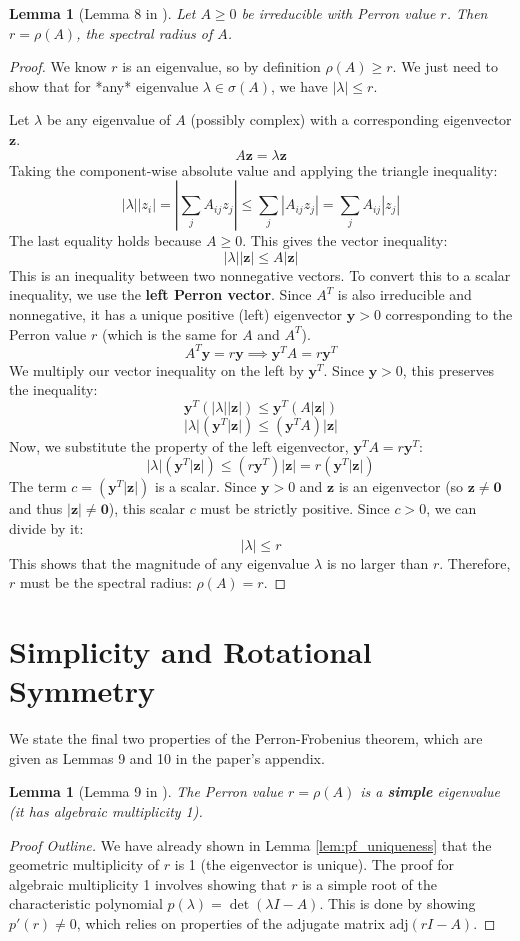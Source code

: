 \documentclass[12pt,a4paper]{report}
\theoremstyle{plain}
\newtheorem{lemma}[theorem]{Lemma}
\theoremstyle{definition}
\theoremstyle{remark}
\begin{document}
\begin{lemma}[Lemma 8 in \cite{main_paper}]\label{lem:pf_dominance}
Let $A \ge 0$ be irreducible with Perron value $r$. Then $r = \rho(A)$, the spectral radius of $A$.
\end{lemma}
\begin{proof}
We know $r$ is an eigenvalue, so by definition $\rho(A) \ge r$. We just need to show that for *any* eigenvalue $\lambda \in \sigma(A)$, we have $|\lambda| \le r$.

Let $\lambda$ be any eigenvalue of $A$ (possibly complex) with a corresponding eigenvector $\bm{z}$.
$$ A\bm{z} = \lambda \bm{z} $$
Taking the component-wise absolute value and applying the triangle inequality:
$$ |\lambda| |z_i| = \left|\sum_j A_{ij} z_j\right| \le \sum_j |A_{ij} z_j| = \sum_j A_{ij} |z_j| $$
The last equality holds because $A \ge 0$. This gives the vector inequality:
$$ |\lambda| |\bm{z}| \le A|\bm{z}| $$
This is an inequality between two nonnegative vectors. To convert this to a scalar inequality, we use the \textbf{left Perron vector}.
Since $A^T$ is also irreducible and nonnegative, it has a unique positive (left) eigenvector $\bm{y} > 0$ corresponding to the Perron value $r$ (which is the same for $A$ and $A^T$).
$$ A^T \bm{y} = r\bm{y} \implies \bm{y}^T A = r \bm{y}^T $$
We multiply our vector inequality on the left by $\bm{y}^T$. Since $\bm{y} > 0$, this preserves the inequality:
$$ \bm{y}^T (|\lambda| |\bm{z}|) \le \bm{y}^T (A|\bm{z}|) $$
$$ |\lambda| (\bm{y}^T |\bm{z}|) \le (\bm{y}^T A) |\bm{z}| $$
Now, we substitute the property of the left eigenvector, $\bm{y}^T A = r \bm{y}^T$:
$$ |\lambda| (\bm{y}^T |\bm{z}|) \le (r \bm{y}^T) |\bm{z}| = r (\bm{y}^T |\bm{z}|) $$
The term $c = (\bm{y}^T |\bm{z}|)$ is a scalar. Since $\bm{y} > 0$ and $\bm{z}$ is an eigenvector (so $\bm{z} \ne \bm{0}$ and thus $|\bm{z}| \ne \bm{0}$), this scalar $c$ must be strictly positive.
Since $c > 0$, we can divide by it:
$$ |\lambda| \le r $$
This shows that the magnitude of any eigenvalue $\lambda$ is no larger than $r$. Therefore, $r$ must be the spectral radius: $\rho(A) = r$.
\end{proof}

\section{Simplicity and Rotational Symmetry}
We state the final two properties of the Perron-Frobenius theorem, which are given as Lemmas 9 and 10 in the paper's appendix.

\begin{lemma}[Lemma 9 in \cite{main_paper}]
The Perron value $r = \rho(A)$ is a \textbf{simple} eigenvalue (it has algebraic multiplicity 1).
\end{lemma}
\begin{proof}[Proof Outline]
We have already shown in Lemma \ref{lem:pf_uniqueness} that the geometric multiplicity of $r$ is 1 (the eigenvector is unique). The proof for algebraic multiplicity 1 involves showing that $r$ is a simple root of the characteristic polynomial $p(\lambda) = \det(\lambda I - A)$. This is done by showing $p'(r) \ne 0$, which relies on properties of the adjugate matrix $\text{adj}(rI - A)$.
\end{proof}
\end{document}
